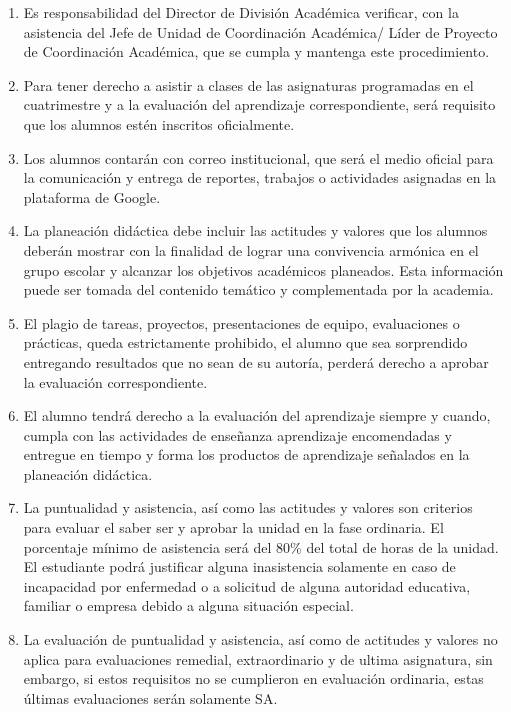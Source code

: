 \documentclass[11pt, letterpaper]{article}
\begin{document}
	\begin{enumerate}
		\item Es responsabilidad del Director de División Académica verificar, con la asistencia del Jefe de Unidad de Coordinación Académica/ Líder de Proyecto de Coordinación Académica, que se cumpla y mantenga este procedimiento.
		
		\item Para tener derecho a asistir a clases de las asignaturas programadas en el cuatrimestre y a la evaluación del aprendizaje correspondiente, será requisito que los alumnos estén inscritos oficialmente.
		
		\item Los alumnos contarán con correo institucional, que será el medio oficial para la comunicación y entrega de reportes, trabajos o actividades asignadas en la plataforma de Google.
		
		\item La planeación didáctica debe incluir las actitudes y valores que los alumnos deberán mostrar con la finalidad de lograr una convivencia armónica en el grupo escolar y alcanzar los objetivos académicos planeados. Esta información puede ser tomada del contenido temático y complementada por la academia.
		
		\item El plagio de tareas, proyectos, presentaciones de equipo, evaluaciones o prácticas, queda estrictamente prohibido, el alumno que sea sorprendido entregando resultados que no sean de su autoría, perderá derecho a aprobar la evaluación correspondiente.
		
		\item El alumno tendrá derecho a la evaluación del aprendizaje siempre y cuando, cumpla con las actividades de enseñanza aprendizaje encomendadas y entregue en tiempo y forma los productos de aprendizaje señalados en la planeación didáctica.
		
		\item La puntualidad y asistencia, así como las actitudes y valores son criterios para evaluar el saber ser y aprobar la unidad en la fase ordinaria. El porcentaje mínimo de asistencia será del 80\% del total de horas de la unidad. El estudiante podrá justificar alguna inasistencia solamente en caso de incapacidad por enfermedad o a solicitud de alguna autoridad educativa, familiar o empresa debido a alguna situación especial.
		
		\item La evaluación de puntualidad y asistencia, así como de actitudes y valores no aplica para evaluaciones remedial, extraordinario y de ultima asignatura, sin embargo, si estos requisitos no se cumplieron en evaluación ordinaria, estas últimas evaluaciones serán solamente SA.
		

\end{enumerate}
\end{document}
